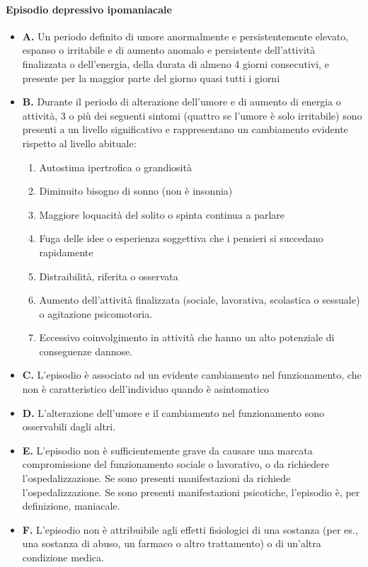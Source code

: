 \paragraph{Episodio depressivo ipomaniacale}  
\begin{itemize}
	\item \textbf{A.} Un periodo definito di umore anormalmente e persistentemente elevato, espanso o irritabile e di aumento anomalo e persistente dell'attività finalizzata o dell'energia, della durata di almeno 4 giorni consecutivi, e presente per la maggior parte del giorno quasi tutti i giorni
	\item \textbf{B.} Durante il periodo di alterazione dell'umore e di aumento di energia o attività, 3 o più dei seguenti sintomi (quattro se l'umore è solo irritabile) sono presenti a un livello significativo e rappresentano un cambiamento evidente rispetto al livello abituale:
	\begin{enumerate}
		\item Autostima ipertrofica o grandiosità
		\item Diminuito bisogno di sonno (non è insonnia)
		\item Maggiore loquacità del solito o spinta continua a parlare
		\item Fuga delle idee o esperienza soggettiva che i pensieri si succedano rapidamente
		\item Distraibilità, riferita o osservata
		\item Aumento dell'attività finalizzata (sociale, lavorativa, scolastica o sessuale) o agitazione psicomotoria.
		\item Eccessivo coinvolgimento in attività che hanno un alto potenziale di conseguenze dannose.
	\end{enumerate}

	\item \textbf{C.} L'episodio è associato ad un evidente cambiamento nel funzionamento, che non è caratteristico dell'individuo quando è asintomatico
	\item \textbf{D.} L'alterazione dell'umore e il cambiamento nel funzionamento sono osservabili dagli altri.
	\item \textbf{E.} L'episodio non è sufficientemente grave da causare una marcata compromissione del funzionamento sociale o lavorativo, o da richiedere l'ospedalizzazione. Se sono presenti manifestazioni da richiede l'ospedalizzazione. Se sono presenti  manifestazioni psicotiche, l'episodio è, per definizione, maniacale.
	\item \textbf{F.}  L’episodio non è attribuibile agli effetti fisiologici di una sostanza
(per es., una sostanza di abuso, un farmaco o altro trattamento) o
di un’altra condizione medica.
\end{itemize}
